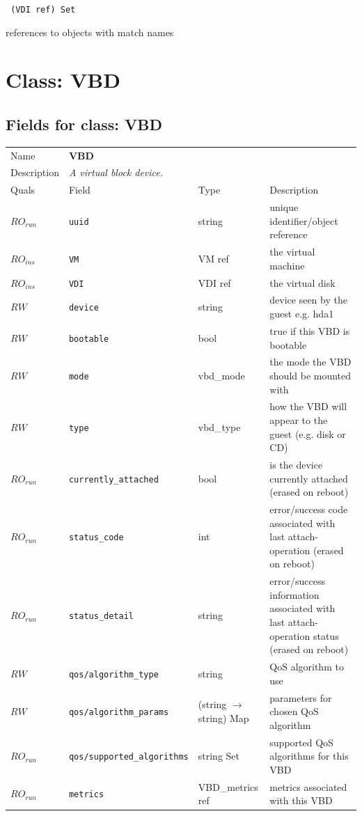 \vspace{0.3cm}

{\tt 
(VDI ref) Set
}


references to objects with match names
\vspace{0.3cm}
\vspace{0.3cm}
\vspace{0.3cm}

\vspace{1cm}
\newpage
\section{Class: VBD}
\subsection{Fields for class: VBD}
\begin{longtable}{|lllp{}|}
\hline
\multicolumn{1}{|l}{Name} & \multicolumn{3}{l|}{\bf VBD} \\
\multicolumn{1}{|l}{Description} & \multicolumn{3}{l|}{\parbox{11cm}{\em A
virtual block device.}} \\
\hline
Quals & Field & Type & Description \\
\hline
$\mathit{RO}_\mathit{run}$ &  {\tt uuid} & string & unique identifier/object reference \\
$\mathit{RO}_\mathit{ins}$ &  {\tt VM} & VM ref & the virtual machine \\
$\mathit{RO}_\mathit{ins}$ &  {\tt VDI} & VDI ref & the virtual disk \\
$\mathit{RW}$ &  {\tt device} & string & device seen by the guest e.g. hda1 \\
$\mathit{RW}$ &  {\tt bootable} & bool & true if this VBD is bootable \\
$\mathit{RW}$ &  {\tt mode} & vbd\_mode & the mode the VBD should be mounted with \\
$\mathit{RW}$ &  {\tt type} & vbd\_type & how the VBD will appear to the guest (e.g. disk or CD) \\
$\mathit{RO}_\mathit{run}$ &  {\tt currently\_attached} & bool & is the device currently attached (erased on reboot) \\
$\mathit{RO}_\mathit{run}$ &  {\tt status\_code} & int & error/success code associated with last attach-operation (erased on reboot) \\
$\mathit{RO}_\mathit{run}$ &  {\tt status\_detail} & string & error/success information associated with last attach-operation status (erased on reboot) \\
$\mathit{RW}$ &  {\tt qos/algorithm\_type} & string & QoS algorithm to use \\
$\mathit{RW}$ &  {\tt qos/algorithm\_params} & (string $\rightarrow$ string) Map & parameters for chosen QoS algorithm \\
$\mathit{RO}_\mathit{run}$ &  {\tt qos/supported\_algorithms} & string Set & supported QoS algorithms for this VBD \\
$\mathit{RO}_\mathit{run}$ &  {\tt metrics} & VBD\_metrics ref & metrics associated with this VBD \\
\hline
\end{longtable}
